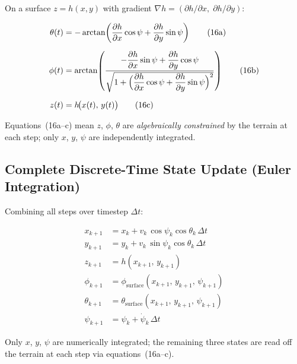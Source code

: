 \documentclass[12pt,a4paper]{article}
\newcommand{\cth}{\cos\theta}
\newcommand{\cps}{\cos\psi}
\newcommand{\sps}{\sin\psi}
\begin{document}
On a surface $z = h(x,y)$ with gradient
$\nabla h = (\partial h/\partial x,\;\partial h/\partial y)$:

\begin{align}
  \theta(t) &= -\arctan\!\left(
      \frac{\partial h}{\partial x}\cos\psi
    + \frac{\partial h}{\partial y}\sin\psi
    \right)
  \tag{16a} \\[6pt]
  \phi(t)   &= \arctan\!\left(
    \frac{
      -\dfrac{\partial h}{\partial x}\sin\psi
      + \dfrac{\partial h}{\partial y}\cos\psi
    }{
      \sqrt{1 + \Bigl(
        \dfrac{\partial h}{\partial x}\cos\psi
        + \dfrac{\partial h}{\partial y}\sin\psi
      \Bigr)^2}
    }
    \right)
  \tag{16b} \\[6pt]
  z(t) &= h\!\bigl(x(t),\,y(t)\bigr)
  \tag{16c}
\end{align}

Equations~(16a--c) mean $z$, $\phi$, $\theta$ are \emph{algebraically
constrained} by the terrain at each step; only $x$, $y$, $\psi$ are
independently integrated.

\subsection{Complete Discrete-Time State Update (Euler Integration)}

Combining all steps over timestep $\Delta t$:

\begin{equation}
  \boxed{
  \begin{aligned}
    x_{k+1}      &= x_k      + v_k\,\cps_k\cth_k\,\Delta t \\
    y_{k+1}      &= y_k      + v_k\,\sps_k\cth_k\,\Delta t \\
    z_{k+1}      &= h(x_{k+1},\,y_{k+1}) \\
    \phi_{k+1}   &= \phi_{\text{surface}}(x_{k+1},\,y_{k+1},\,\psi_{k+1}) \\
    \theta_{k+1} &= \theta_{\text{surface}}(x_{k+1},\,y_{k+1},\,\psi_{k+1}) \\
    \psi_{k+1}   &= \psi_k   + \dot\psi_k\,\Delta t
  \end{aligned}
  }
  \tag{17}
\end{equation}

Only $x$, $y$, $\psi$ are numerically integrated; the remaining three states
are read off the terrain at each step via equations~(16a--c).

\end{document}

